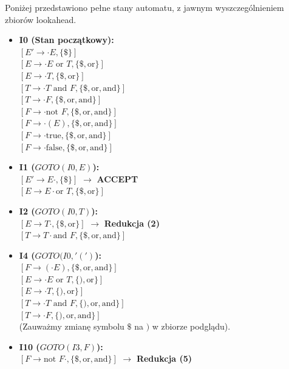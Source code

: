 \documentclass[11pt, a4paper]{article}
\begin{document}
Poniżej przedstawiono pełne stany automatu, z jawnym wyszczególnieniem zbiorów lookahead.

\begin{itemize}
    \item \textbf{I0 (Stan początkowy):} \\
    $[E' \to \cdot E, \{ \$ \}]$ \\
    $[E \to \cdot E \text{ or } T, \{ \$, \text{or} \}]$ \\
    $[E \to \cdot T, \{ \$, \text{or} \}]$ \\
    $[T \to \cdot T \text{ and } F, \{ \$, \text{or}, \text{and} \}]$ \\
    $[T \to \cdot F, \{ \$, \text{or}, \text{and} \}]$ \\
    $[F \to \cdot \text{not } F, \{ \$, \text{or}, \text{and} \}]$ \\
    $[F \to \cdot (E), \{ \$, \text{or}, \text{and} \}]$ \\
    $[F \to \cdot \text{true}, \{ \$, \text{or}, \text{and} \}]$ \\
    $[F \to \cdot \text{false}, \{ \$, \text{or}, \text{and} \}]$

    \item \textbf{I1 ($GOTO(I0, E)$):} \\
    $[E' \to E \cdot, \{ \$ \}]$ $\rightarrow$ \textbf{ACCEPT} \\
    $[E \to E \cdot \text{or } T, \{ \$, \text{or} \}]$

    \item \textbf{I2 ($GOTO(I0, T)$):} \\
    $[E \to T \cdot, \{ \$, \text{or} \}]$ $\rightarrow$ \textbf{Redukcja (2)} \\
    $[T \to T \cdot \text{and } F, \{ \$, \text{or}, \text{and} \}]$

    \item \textbf{I4 ($GOTO(I0, '(')$):} \\
    $[F \to ( \cdot E ), \{ \$, \text{or}, \text{and} \}]$ \\
    $[E \to \cdot E \text{ or } T, \{ ), \text{or} \}]$ \\
    $[E \to \cdot T, \{ ), \text{or} \}]$ \\
    $[T \to \cdot T \text{ and } F, \{ ), \text{or}, \text{and} \}]$ \\
    $[T \to \cdot F, \{ ), \text{or}, \text{and} \}]$ \\
    (Zauważmy zmianę symbolu $\$$ na $)$ w zbiorze podglądu).

    \item \textbf{I10 ($GOTO(I3, F)$):} \\
    $[F \to \text{not } F \cdot, \{ \$, \text{or}, \text{and} \}]$ $\rightarrow$ \textbf{Redukcja (5)}
\end{itemize}
\end{document}
